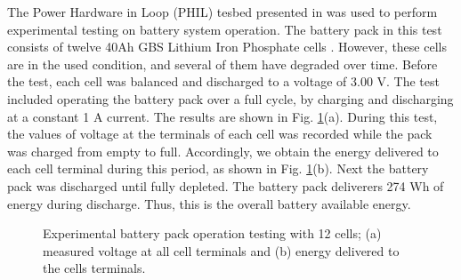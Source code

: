 \documentclass[10pt,twocolumn]{IEEEtran}
\begin{document}
The Power Hardware in Loop (PHIL) tesbed presented in \cite{NAPS_RTDS} was used to perform experimental testing on battery system operation. The battery pack in this test consists of twelve  40Ah GBS Lithium Iron Phosphate cells \cite{elitepower}. However, these cells are in the used condition, and several of them have degraded over time.  Before the test, each cell was balanced and discharged to a voltage of 3.00 V.  The test included operating the battery pack over a full cycle, by charging and discharging at a constant 1 A current. The results are shown in Fig. \ref{fig:initial_soc}(a).
During this test, the values of voltage at the terminals of each cell   was recorded while the pack was charged from empty to full.  Accordingly, we obtain the energy delivered to each cell terminal during this period, as shown in Fig. \ref{fig:initial_soc}(b). Next the battery pack was discharged until fully depleted. The battery pack deliverers  274 Wh of energy during discharge.
Thus, this is the overall battery available energy.



\begin{figure}[t]
\centering
\vspace{-0.2cm}
{} \vspace{-0.1cm}
\caption{Experimental battery pack operation testing with 12 cells; (a) measured voltage at all cell terminals and (b) energy delivered to the cells  terminals.}
\vspace{-0.3cm}
\label{fig:initial_soc}
\end{figure}
\end{document}
